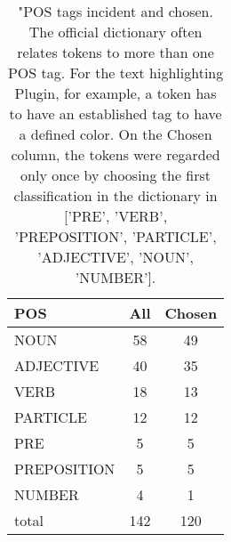\begin{table*}[h!]
\begin{center}
\caption{"POS tags incident and chosen.
            The official dictionary often relates tokens
            to more than one POS tag.
            For the text highlighting Plugin, for example,
            a token has to have an established tag to have
            a defined color.
            On the Chosen column, the tokens were regarded only once
            by choosing the first classification in the dictionary in ['PRE', 'VERB', 'PREPOSITION', 'PARTICLE', 'ADJECTIVE', 'NOUN', 'NUMBER'].}
\begin{tabular}{| l | c | c |}\hline
POS & All  & Chosen \\\hline
NOUN & 58  & 49 \\\hline
ADJECTIVE & 40  & 35 \\\hline
VERB & 18  & 13 \\\hline
PARTICLE & 12  & 12 \\\hline
PRE & 5  & 5 \\\hline
PREPOSITION & 5  & 5 \\\hline
NUMBER & 4  & 1 \\\hline
total & 142  & 120 \\\hline
\end{tabular}\end{center}
\end{table*}